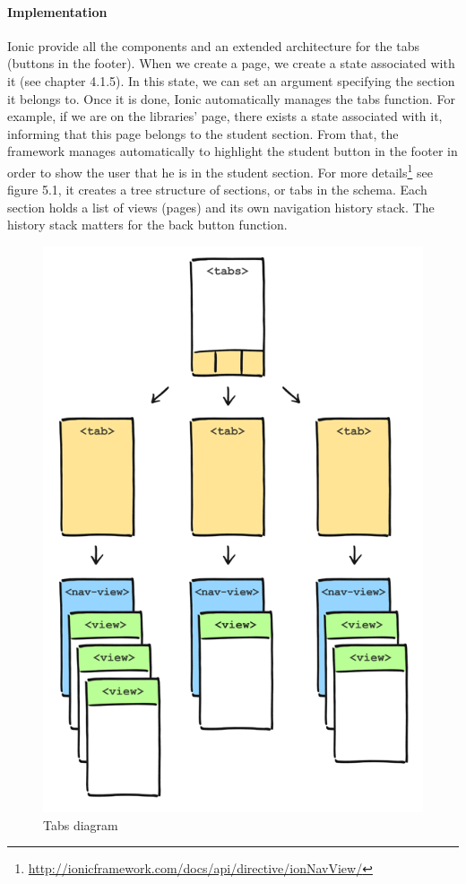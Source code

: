 \documentclass{eplmastersthesis}
\begin{document}
\paragraph{Implementation}
Ionic provide all the components and an extended architecture for the tabs (buttons in the footer). When we create a page, we create a state associated with it (see chapter 4.1.5). In this state, we can set an argument specifying the section it belongs to. Once it is done, Ionic automatically manages the tabs function. 
For example, if we are on the libraries’ page, there exists a state associated with it, informing that this page belongs to the student section. From that, the framework manages automatically to highlight the student button in the footer in order to show the user that he is in the student section.
For more details\footnote{\url{http://ionicframework.com/docs/api/directive/ionNavView/}} see figure 5.1, it creates a tree structure of sections, or tabs in the schema. Each section holds a list of views (pages) and its own navigation history stack. The history stack matters for the back button function. 
\begin{figure}[H]
\centering
\includegraphics[scale = 0.3]{Images/tabs-nav-stack.png}
\caption{Tabs diagram}
\end{figure}
\end{document}
